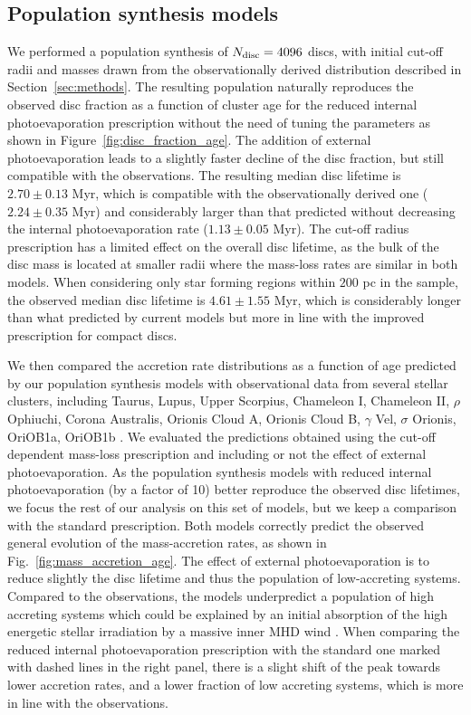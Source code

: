 \documentclass[fleqn,usenatbib]{mnras}
\begin{document}
\subsection{Population synthesis models}

We performed a population synthesis of $N_{\rm disc} = 4096$ discs, with initial cut-off radii and masses drawn from the observationally derived distribution described in Section~\ref{sec:methods}.
The resulting population naturally reproduces the observed disc fraction as a function of cluster age \citep[e.g.][]{2009AIPC.1158....3M} for the reduced internal photoevaporation prescription without the need of tuning the parameters as shown in Figure~\ref{fig:disc_fraction_age}. The addition of external photoevaporation leads to a slightly faster decline of the disc fraction, but still compatible with the observations.
The resulting median disc lifetime is $2.70 \pm 0.13$ Myr, which is compatible with the observationally derived one ($2.24 \pm 0.35$ Myr) and considerably larger than that predicted without decreasing the internal photoevaporation rate ($1.13 \pm 0.05$ Myr).
The cut-off radius prescription has a limited effect on the overall disc lifetime, as the bulk of the disc mass is located at smaller radii where the mass-loss rates are similar in both models.
When considering only star forming regions within $200$ pc in the \citet{2023ASPC..534..539M} sample, the observed median disc lifetime is $4.61 \pm 1.55$ Myr, which is considerably longer than what predicted by current models but more in line with the improved prescription for compact discs.

We then compared the accretion rate distributions as a function of age predicted by our population synthesis models with observational data from several stellar clusters, including Taurus, Lupus, Upper Scorpius, Chameleon I, Chameleon II, $\rho$ Ophiuchi, Corona Australis, Orionis Cloud A, Orionis Cloud B, $\gamma$ Vel, $\sigma$ Orionis, OriOB1a, OriOB1b \citep{2023ASPC..534..539M, 2022yCat..51630074T}. 
We evaluated the predictions obtained using the cut-off dependent mass-loss prescription and including or not the effect of external photoevaporation.
As the population synthesis models with reduced internal photoevaporation (by a factor of 10) better reproduce the observed disc lifetimes, we focus the rest of our analysis on this set of models, but we keep a comparison with the standard prescription.
Both models correctly predict the observed general evolution of the mass-accretion rates, as shown in Fig.~\ref{fig:mass_accretion_age}.
The effect of external photoevaporation is to reduce slightly the disc lifetime and thus the population of low-accreting systems.
Compared to the observations, the models underpredict a population of high accreting systems which could be explained by an initial absorption of the high energetic stellar irradiation by a massive inner MHD wind \citep{2023ASPC..534..567P}.
When comparing the reduced internal photoevaporation prescription with the standard one marked with dashed lines in the right panel, there is a slight shift of the peak towards lower accretion rates, and a lower fraction of low accreting systems, which is more in line with the observations.
\end{document}
